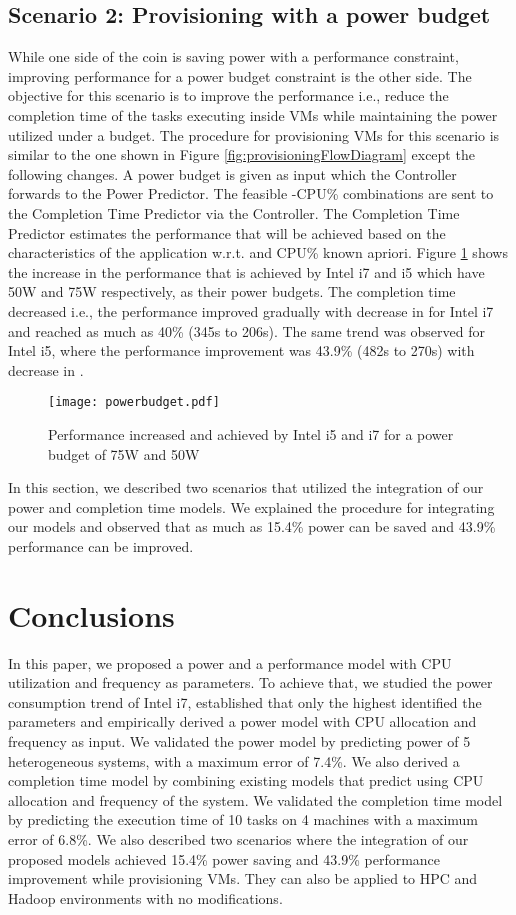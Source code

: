 \documentclass{sig-alternate}
\begin{document}
\subsection{Scenario 2: Provisioning with a power budget}
While one side of the coin is saving power with a performance constraint, improving performance for a power budget constraint is the other side. The objective for this scenario is to improve the performance i.e., reduce the completion time of the tasks executing inside VMs while maintaining the power utilized under a budget. The procedure for provisioning VMs for this scenario is similar to  the one shown in Figure \ref{fig:provisioningFlowDiagram} except the following changes.  A power budget is given as input which the Controller forwards to the Power Predictor. The feasible -CPU\% combinations are sent to the Completion Time Predictor via the Controller. The Completion Time Predictor estimates the performance that will be achieved based on the characteristics of the application w.r.t.  and CPU\% known apriori. Figure \ref{fig:powerbudget} shows the increase in the performance that is achieved by Intel i7 and i5 which have 50W and 75W respectively, as their power budgets. The completion time decreased i.e., the performance improved gradually with decrease in  for Intel i7 and reached as much as 40\% (345s to 206s). The same trend was observed for Intel i5, where the performance improvement was 43.9\% (482s to 270s) with decrease in . 


\begin{figure}[!htbp]
\centering
\texttt{[image: powerbudget.pdf]}
 \vspace{-0.5cm}
\caption{Performance increased and achieved by Intel i5 and i7 for a power budget of 75W and 50W}
\label{fig:powerbudget}
\end{figure}

In this section, we described two scenarios that utilized the integration of our power and completion time models. We explained the procedure for integrating our models and observed that as much as 15.4\% power can be saved and 43.9\% performance can be improved. 

\section{Conclusions}
\label{sec:conclusions}
In this paper, we proposed a power and a performance model with CPU utilization and frequency as parameters. To achieve that, we studied the power consumption trend of Intel i7, established that only the highest identified the parameters and empirically derived a power model with CPU allocation and frequency as input. We validated the power model by predicting power of 5 heterogeneous systems, with a maximum error of 7.4\%. We also derived a completion time model by combining existing models that predict using CPU allocation and frequency of the system. We validated the completion time model by predicting the execution time of 10 tasks on 4 machines with a maximum error of 6.8\%. We also described two scenarios where the integration of our proposed models achieved 15.4\% power saving and 43.9\% performance improvement while provisioning VMs. They can also be applied to HPC and Hadoop environments with no modifications.
\end{document}
